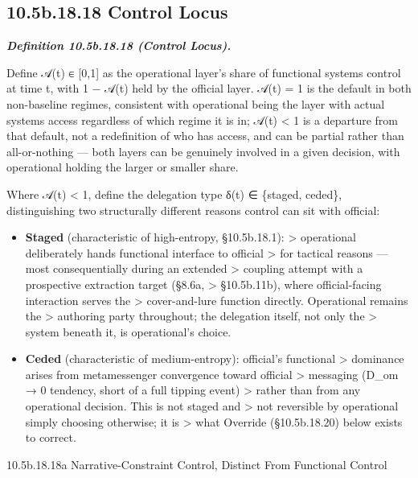 \documentclass[
]{article}
\begin{document}
\hypertarget{b.18.18-control-locus}{%
\subsection{10.5b.18.18 Control Locus}\label{b.18.18-control-locus}}

\emph{\textbf{Definition 10.5b.18.18 (Control Locus).}}

Define 𝒜(t) ∈ {[}0,1{]} as the operational layer's share of functional
systems control at time t, with 1 − 𝒜(t) held by the official layer.
𝒜(t) = 1 is the default in both non-baseline regimes, consistent with
operational being the layer with actual systems access regardless of
which regime it is in; 𝒜(t) \textless{} 1 is a departure from that
default, not a redefinition of who has access, and can be partial rather
than all-or-nothing --- both layers can be genuinely involved in a given
decision, with operational holding the larger or smaller share.

Where 𝒜(t) \textless{} 1, define the delegation type δ(t) ∈ \{staged,
ceded\}, distinguishing two structurally different reasons control can
sit with official:

\begin{itemize}
\item
  \textbf{Staged} (characteristic of high-entropy, §10.5b.18.1):
  \textgreater{} operational deliberately hands functional interface to
  official \textgreater{} for tactical reasons --- most consequentially
  during an extended \textgreater{} coupling attempt with a prospective
  extraction target (§8.6a, \textgreater{} §10.5b.11b), where
  official-facing interaction serves the \textgreater{} cover-and-lure
  function directly. Operational remains the \textgreater{} authoring
  party throughout; the delegation itself, not only the \textgreater{}
  system beneath it, is operational's choice.
\item
  \textbf{Ceded} (characteristic of medium-entropy): official's
  functional \textgreater{} dominance arises from metamessenger
  convergence toward official \textgreater{} messaging (D\_om → 0
  tendency, short of a full tipping event) \textgreater{} rather than
  from any operational decision. This is not staged and \textgreater{}
  not reversible by operational simply choosing otherwise; it is
  \textgreater{} what Override (§10.5b.18.20) below exists to correct.
\end{itemize}

10.5b.18.18a Narrative-Constraint Control, Distinct From Functional
Control
\end{document}
